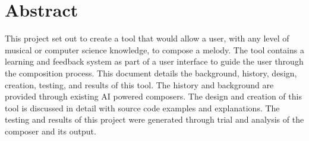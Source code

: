 \chapter*{Abstract} 

This project set out to create a tool that would allow a user, with any level of musical or computer science knowledge, to compose a melody.  The tool contains a learning and feedback system as part of a user interface to guide the user through the composition process.  This document details the background, history, design, creation, testing, and results of this tool.  The history and background are provided through existing AI powered composers.  The design and creation of this tool is discussed in detail with source code examples and explanations.  The testing and results of this project were generated through trial and analysis of the composer and its output.